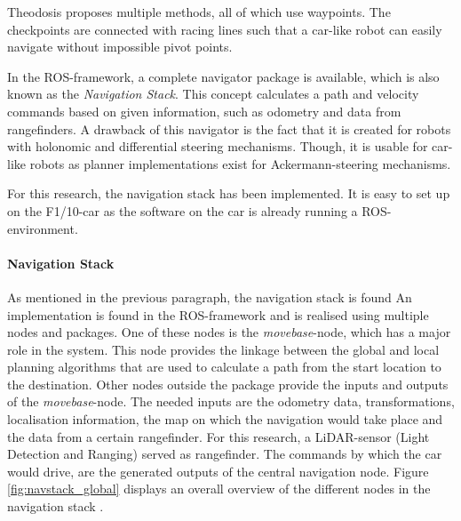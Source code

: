 \documentclass[conference,a4paper]{IEEEtran}
\begin{document}
Theodosis \cite{Theodosis2014} proposes multiple methods, all of which use waypoints. The checkpoints are connected with racing lines such that a car-like robot can easily navigate without impossible pivot points. 

In the ROS-framework, a complete navigator package is available, which is also known as the \emph{Navigation Stack}. This concept calculates a path and velocity commands based on given information, such as odometry and data from rangefinders. A drawback of this navigator is the fact that it is created for robots with holonomic and differential steering mechanisms. Though, it is usable for car-like robots as planner implementations exist for Ackermann-steering mechanisms.

For this research, the navigation stack has been implemented. It is easy to set up on the F1/10-car as the software on the car is already running a ROS-environment.

\paragraph{Navigation Stack}
As mentioned in the previous paragraph, the navigation stack is found An implementation is found in the ROS-framework and is realised using multiple nodes and packages. One of these nodes is the \emph{move\textunderscore base}-node, which has a major role in the system. This node provides the linkage between the global and local planning algorithms that are used to calculate a path from the start location to the destination. Other nodes outside the package provide the inputs and outputs of the \emph{move\textunderscore base}-node. The needed inputs are the odometry data, transformations, localisation information, the map on which the navigation would take place and the data from a certain rangefinder. For this research, a LiDAR-sensor (Light Detection and Ranging) served as rangefinder. The commands by which the car would drive, are the generated outputs of the central navigation node. Figure \ref{fig:navstack_global} displays an overall overview of the different nodes in the navigation stack \cite{Marder-Eppstein2016}. 
\end{document}
